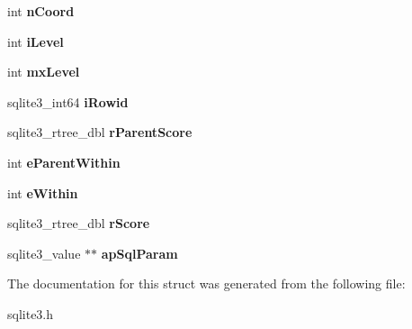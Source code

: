 \begin{DoxyCompactItemize}
int {\bfseries n\+Coord}
\item 
\mbox{\label{structsqlite3__rtree__query__info_af91ca2d5f867b3b0aa9c91920a3b5b45}} 
int {\bfseries i\+Level}
\item 
\mbox{\label{structsqlite3__rtree__query__info_ac84533734fb4c86c3f2deba904118785}} 
int {\bfseries mx\+Level}
\item 
\mbox{\label{structsqlite3__rtree__query__info_a9e43489993c8aeace851f86eaa00ec26}} 
sqlite3\+\_\+int64 {\bfseries i\+Rowid}
\item 
\mbox{\label{structsqlite3__rtree__query__info_af7da93e7fc405eec7e7ec90ab237eab2}} 
sqlite3\+\_\+rtree\+\_\+dbl {\bfseries r\+Parent\+Score}
\item 
\mbox{\label{structsqlite3__rtree__query__info_a8bd37c6af5427c35830f674a4db682c3}} 
int {\bfseries e\+Parent\+Within}
\item 
\mbox{\label{structsqlite3__rtree__query__info_ad1038309f7ea55472a7ff99bf4f9d514}} 
int {\bfseries e\+Within}
\item 
\mbox{\label{structsqlite3__rtree__query__info_af449e4a3607573d17b3d31c67b6e1584}} 
sqlite3\+\_\+rtree\+\_\+dbl {\bfseries r\+Score}
\item 
\mbox{\label{structsqlite3__rtree__query__info_a57ccb3cce45dd946e5184b5addeb0326}} 
sqlite3\+\_\+value $\ast$$\ast$ {\bfseries ap\+Sql\+Param}
\end{DoxyCompactItemize}


The documentation for this struct was generated from the following file\+:\begin{DoxyCompactItemize}
\item 
sqlite3.\+h\end{DoxyCompactItemize}

